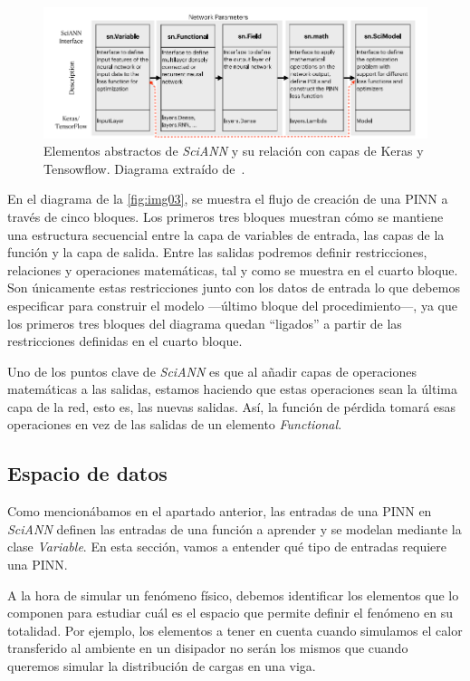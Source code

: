  \begin{figure}[h]
    \centering
    \includegraphics[width=1\textwidth]{img/img03.png}
    \caption{Elementos abstractos de \textit{SciANN} y su relación con capas de Keras y Tensowflow. Diagrama extraído de~\cite{Haghighat2021}.}
    \label{fig:img03}
\end{figure}

En el diagrama de la \autoref{fig:img03}, se muestra el flujo de creación de una PINN a través de cinco bloques. Los primeros tres bloques muestran cómo se mantiene una estructura secuencial entre la capa de variables de entrada, las capas de la función y la capa de salida. Entre las salidas podremos definir restricciones, relaciones y operaciones matemáticas, tal y como se muestra en el cuarto bloque. Son únicamente estas restricciones junto con los datos de entrada lo que debemos especificar para construir el modelo ---último bloque del procedimiento---, ya que los primeros tres bloques del diagrama quedan ``ligados'' a partir de las restricciones definidas en el cuarto bloque. 

Uno de los puntos clave de \textit{SciANN} es que al añadir capas de operaciones matemáticas a las salidas, estamos haciendo que estas operaciones sean la última capa de la red, esto es, las nuevas salidas. Así, la función de pérdida tomará esas operaciones en vez de las salidas de un elemento \textit{Functional}. 

\subsection{Espacio de datos}

Como mencionábamos en el apartado anterior, las entradas de una PINN en \textit{SciANN} definen las entradas de una función a aprender y se modelan mediante la clase \textit{Variable}. En esta sección, vamos a entender qué tipo de entradas requiere una PINN. 

A la hora de simular un fenómeno físico, debemos identificar los elementos que lo componen para estudiar cuál es el espacio que permite definir el fenómeno en su totalidad. Por ejemplo, los elementos a tener en cuenta cuando simulamos el calor transferido al ambiente en un disipador no serán los mismos que cuando queremos simular la distribución de cargas en una viga. 

